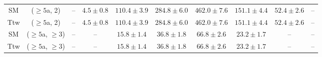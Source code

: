 \begin{table}[h!]
{\begin{tabular}{cccccccccc}
	SM & ($\ge5$a, 2) & -- & $4.5\pm 0.8$ & $110.4\pm 3.9$ & $284.8\pm 6.0$ & $462.0\pm 7.6$ & $151.1\pm 4.4$ & $52.4\pm 2.6$ & -- \\[0.5ex] 
	Ttw & ($\ge5$a, 2) & -- & $4.5\pm 0.8$ & $110.4\pm 3.9$ & $284.8\pm 6.0$ & $462.0\pm 7.6$ & $151.1\pm 4.4$ & $52.4\pm 2.6$ & -- \\[0.5ex] 
	SM & ($\ge5$a, $\ge3$) & -- & -- & $15.8\pm 1.4$ & $36.8\pm 1.8$ & $66.8\pm 2.6$ & $23.2\pm 1.7$ & -- & -- \\[0.5ex] 
	Ttw & ($\ge5$a, $\ge3$) & -- & -- & $15.8\pm 1.4$ & $36.8\pm 1.8$ & $66.8\pm 2.6$ & $23.2\pm 1.7$ & -- & -- \\[0.5ex] 
	\hline
	\hline
\end{tabular}}
\end{table}
